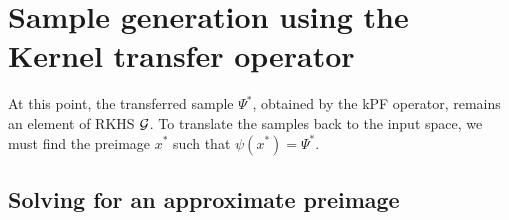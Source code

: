



\section{Sample generation using the Kernel transfer operator}\label{sec:gen_sample}
At this point, the transferred sample  $\Psi^*$, obtained by the kPF operator, remains an element of RKHS $\mathcal{G}$. To translate the samples back to the input space, we must find the  preimage $x^*$ such that $\psi(x^*) = \Psi^*$.

\subsection{Solving for an approximate preimage}\label{sec:preimage}

